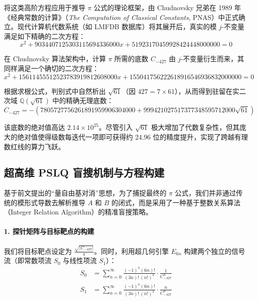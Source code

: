 \documentclass[11pt,a4paper]{ctexart}
\begin{document}
将这类高阶方程应用于推导 $\pi$ 公式的理论框架，由 Chudnovsky 兄弟在 1989 年《经典常数的计算》（\textit{The Computation of Classical Constants}, PNAS）中正式确立。现代计算机代数系统（如 LMFDB 数据库）将其展开后，真实的模 $j$-不变量满足如下精确的二次方程：
\begin{equation}
x^2 + 9034407125303115694336000x + 51923170459928424448000000 = 0
\end{equation}

在 Chudnovsky 算法架构中，计算 $\pi$ 所需的底数 $C_{-427}$ 由 $j$-不变量衍生而来，其同样满足一个确切的二次方程：
\begin{equation}
x^2 + 15611455512523783919812608000x + 155041756222618916546936832000000 = 0
\end{equation}

根据求根公式，判别式中自然析出 $\sqrt{61}$（因 $427 = 7 \times 61$），从而得到驻留在实二次域 $\mathbb{Q}(\sqrt{61})$ 中的精确无理底数：
\begin{equation}
C_{-427} = -(7805727756261891959906304000 + 999421027517377348595712000\sqrt{61})
\end{equation}

该底数的绝对值高达 $2.14 \times 10^{25}$。尽管引入 $\sqrt{61}$ 极大增加了代数复杂性，但其庞大的绝对值使得级数每迭代一项即可获得约 24.96 位的精度提升，实现了跨越有理数红线的算力飞跃。

\subsection{超高维 PSLQ 盲搜机制与方程构建}

基于前文提出的“量自由基对消”思想，为了捕捉最终的 $\pi$ 公式，我们并非通过传统的模形式导数去解析推导 $A$ 和 $B$ 的闭式，而是采用了一种基于整数关系算法（Integer Relation Algorithm）的精准盲搜策略。

\paragraph{1. 探针矩阵与目标靶点的构建}
我们将目标靶点设定为 $\frac{\sqrt{|C_{-427}|}}{\pi}$。同时，利用超几何引擎 $E_{6n}$ 构建两个独立的信号流（即常数项流 $S_0$ 与线性项流 $S_1$）：
\begin{align}
S_0 &= \sum_{n=0}^{\infty} \frac{(-1)^n (6n)!}{(3n)!\,(n!)^3} \cdot \frac{1}{C_{-427}^n} \\
S_1 &= \sum_{n=0}^{\infty} \frac{(-1)^n (6n)!}{(3n)!\,(n!)^3} \cdot \frac{n}{C_{-427}^n}
\end{align}
\end{document}
